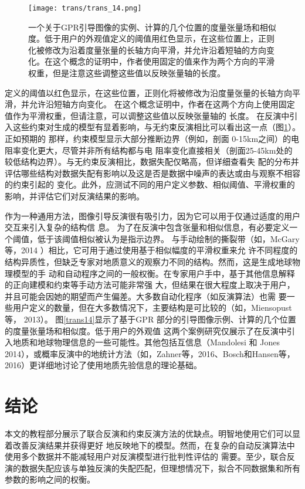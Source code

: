 \begin{figure}[H]
    \centering
    \texttt{[image: trans/trans\_14.png]}     
    \caption{一个关于GPR引导图像的实例、计算的几个位置的度量张量场和相似度。低于用户的外观值定义的阈值用红色显示，在这些位置上，正则化被修改为沿着度量张量的长轴方向平滑，并允许沿着短轴的方向变化。在这个概念的证明中，作者使用固定的值来作为两个方向的平滑权重，但是注意这些调整这些值以反映张量轴的长度。}
    \label{trans15}
\end{figure}


定义的阈值以红色显示，在这些位置，正则化将被修改为沿度量张量的长轴方向平滑，并允许沿短轴方向变化。 在这个概念证明中，作者在这两个方向上使用固定值作为平滑权重，但请注意，可以调整这些值以反映张量轴的 长度。 在反演中引入这些约束对生成的模型有显着影响，与无约束反演相比可以看出这一点（图\ref{trans15}）。正如预期的 那样，约束模型显示大部分推断边界（例如，剖面 0-15km之间）的电阻率变化更大，尽管并非所有结构都与电 阻率变化直接相关（剖面25-45km处的较低结构边界）。与无约束反演相比，数据失配仅略高，但详细查看失 配的分布并评估哪些结构对数据失配有影响以及这是否是数据中噪声的表达或由与观察不相容的约束引起的 变化。此外，应测试不同的用户定义参数、相似阈值、平滑权重的影响，并评估它们对反演结果的影响。

作为一种通用方法，图像引导反演很有吸引力，因为它可以用于仅通过适度的用户交互来引入复杂的结构信 息。 为了在反演中包含张量和相似信息，有必要定义一个阈值，低于该阈值相似被认为是指示边界。 与手动绘制的撕裂带（如，McGary 等，2014 ）相比，它可用于通过使用基于相似幅度的平滑权重来允 许不同程度的结构异质性，但缺乏专家对地质意义的观察力不同的结构。然而，这是生成地球物理模型的手 动和自动程序之间的一般权衡。在专家用户手中，基于其他信息解释的正向建模和约束等手动方法可能非常强 大，但结果在很大程度上取决于用户，并且可能会因她的期望而产生偏差。大多数自动化程序（如反演算法）也需 要一些用户定义的数量，但在大多数情况下，主要结构是可比较的（如，Miensopust 等， 2013）。 图\ref{trans14}显示了基于GPR 部分的引导图像示例、计算的几个位置的度量张量场和相似度。低于用户的外观值 这两个案例研究仅展示了在反演中引入地质和地球物理信息的一些可能性。其他包括互信息（Mandolesi 和 Jones 2014），或概率反演中的地统计方法（如，Zahner等，2016、Bosch和Hansen等，2016）更详细地讨论了使用地质先验信息的理论基础。

\section{结论}

本文的教程部分展示了联合反演和约束反演方法的优缺点。明智地使用它们可以显着改善反演结果并获得更好 地反映地下的模型。然而，在复杂的自动反演算法中使用多个数据并不能减轻用户对反演模型进行批判性评估的 需要。至少，联合反演的数据失配应该与单独反演的失配匹配，但理想情况下，拟合不同数据集和所有参数的影响之间的权衡。

